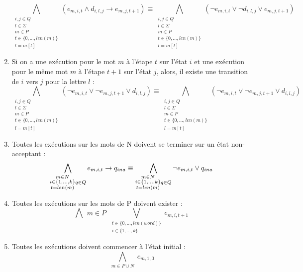\documentclass[a4paper, 12pt]{extarticle}
\begin{document}
\begin{enumerate}
\begin{equation*}
        \bigwedge_{\substack{i,j \in Q\\l \in \Sigma\\m \in P\\t \in \{0,\dots,len(m)\}\\l=m[t]}} (e_{m,i,t} \wedge d_{i,l,j} \rightarrow e_{m,j,t+1}) \equiv
        \bigwedge_{\substack{i,j \in Q\\l \in \Sigma\\m \in P\\t \in \{0,\dots,len(m)\}\\l=m[t]}} (\neg e_{m,i,t} \vee \neg d_{i,l,j} \vee e_{m,j,t+1})
    \end{equation*}
    \item Si on a une exécution pour le mot $m$ à l'étape $t$ sur l'état $i$ et une exécution pour le même mot $m$ à l'étape $t+1$ sur l'état $j$,
    alors, il existe une transition de $i$ vers $j$ pour la lettre $l$ :
    \begin{equation*}
        \bigwedge_{\substack{i,j \in Q\\l \in \Sigma\\m \in P\\t \in \{0,\dots,len(m)\}\\l=m[t]}} (\neg e_{m,i,t} \vee \neg e_{m,j,t+1} \vee d_{i,l,j})\equiv
        \bigwedge_{\substack{i,j \in Q\\l \in \Sigma\\m \in P\\t \in \{0,\dots,len(m)\}\\l=m[t]}} (\neg e_{m,i,t} \vee \neg e_{m,j,t+1} \vee d_{i,l,j})
    \end{equation*}
    \item Toutes les exécutions sur les mots de N doivent se terminer sur un état non-acceptant :
    \begin{equation*}
        \bigwedge_{\substack{m \in N\\i \in \{1,\dots,k\}\\t=len(m)}\\q\in Q} e_{m,i,t} \rightarrow q_{ina}\equiv
        \bigwedge_{\substack{m \in N\\i \in \{1,\dots,k\}\\t=len(m)}\\q\in Q} \neg e_{m,i,t} \vee q_{ina}
    \end{equation*}
    \item Toutes les exécutions sur les mots de P doivent exister :
    \begin{equation*}
        \bigwedge{\substack{m\in P}}\bigvee_{\substack{t\in\{0,\dots,len(word)\}\\i\in \{1,\dots,k\}}} e_{m,i,t+1}
    \end{equation*}
    \item Toutes les exécutions doivent commencer à l'état initial :
    \begin{equation*}
        \bigwedge_{\substack{m\in P\cup N}} e_{m,1,0}
    \end{equation*}
\end{enumerate}
\end{document}
